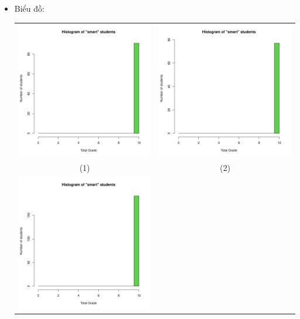 \documentclass[a4paper]{article}
\theoremstyle{definition}
\begin{document}
\begin{enumerate}[a)]
\begin{itemize}
\begin{itemize}
\begin{center}
            \end{center}
        \end{itemize}
        \item Biểu đồ:\\
        \begin{center}
            \begin{tabular}{c c}
                 \includegraphics[width = 6.9cm]{Images/img9-1-1.png} & \includegraphics[width = 6.9cm]{Images/img9-1-2.png} \\
                 (1) & (2) \\
                 \includegraphics[width = 6.9cm]{Images/img9-1-3.png} &

\end{tabular}
\end{center}
\end{itemize}
\end{enumerate}
\end{document}

